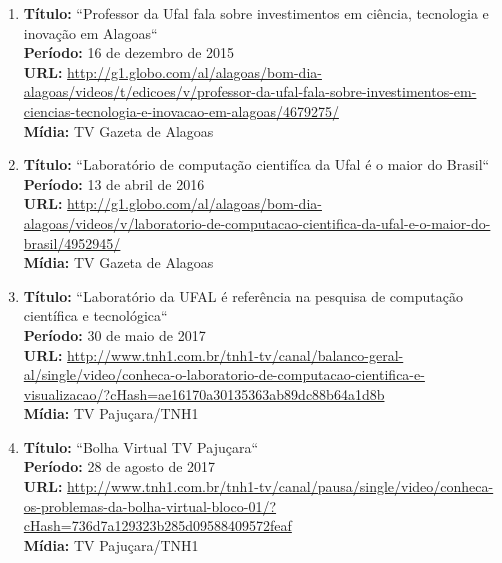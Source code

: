 \documentclass[a4paper,oneside,10pt]{article}
\begin{document}
\begin{enumerate}
\renewcommand{\labelenumi}{{\large\bfseries\arabic{enumi}.}}


\item   \textbf{Título:} ``Professor da Ufal fala sobre investimentos em ciência, tecnologia e inovação em Alagoas``
  \mbox{} \\ 
        \textbf{Período:} 16 de dezembro de 2015\\
        \textbf{URL:} \url{http://g1.globo.com/al/alagoas/bom-dia-alagoas/videos/t/edicoes/v/professor-da-ufal-fala-sobre-investimentos-em-ciencias-tecnologia-e-inovacao-em-alagoas/4679275/}\\
        \textbf{Mídia:} TV Gazeta de Alagoas\\    
        
\item  \textbf{Título:} ``Laboratório de computação cientifíca da Ufal é o maior do Brasil``  \mbox{}\\
        \textbf{Período:} 13 de abril de 2016 \\
        \textbf{URL:} \url{http://g1.globo.com/al/alagoas/bom-dia-alagoas/videos/v/laboratorio-de-computacao-cientifica-da-ufal-e-o-maior-do-brasil/4952945/}\\
        \textbf{Mídia:}  TV Gazeta de Alagoas\\       
        
\item  \textbf{Título:} ``Laboratório da UFAL é referência na pesquisa de computação científica e tecnológica``
  \mbox{} \\
        \textbf{Período:} 30 de maio de 2017\\
        \textbf{URL:} \url{http://www.tnh1.com.br/tnh1-tv/canal/balanco-geral-al/single/video/conheca-o-laboratorio-de-computacao-cientifica-e-visualizacao/?cHash=ae16170a30135363ab89dc88b64a1d8b}\\
        \textbf{Mídia:} TV Pajuçara/TNH1\\
        
\item     \textbf{Título:} ``Bolha Virtual TV Pajuçara``
 \mbox{} \\   
        \textbf{Período:} 28 de agosto de 2017 \\
        \textbf{URL:} \url{http://www.tnh1.com.br/tnh1-tv/canal/pausa/single/video/conheca-os-problemas-da-bolha-virtual-bloco-01/?cHash=736d7a129323b285d09588409572feaf}\\
        \textbf{Mídia:} TV Pajuçara/TNH1\\


\end{enumerate}
\end{document}
